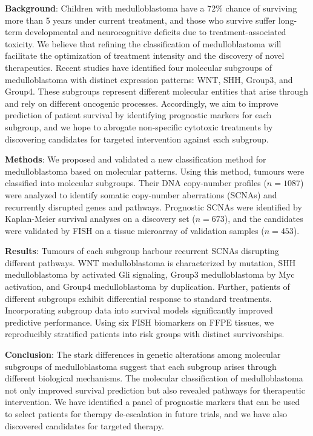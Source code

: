 \textbf{Background}: Children with medulloblastoma have a 72\% chance of surviving more than 5 years under current treatment, and those who survive suffer long-term developmental and neurocognitive deficits due to treatment-associated toxicity. We believe that refining the classification of medulloblastoma will facilitate the optimization of treatment intensity and the discovery of novel therapeutics. Recent studies have identified four molecular subgroups of medulloblastoma with distinct expression patterns: WNT, SHH, Group3, and Group4. These subgroups represent different molecular entities that arise through and rely on different oncogenic processes. Accordingly, we aim to improve prediction of patient survival by identifying prognostic markers for each subgroup, and we hope to abrogate non-specific cytotoxic treatments by discovering candidates for targeted intervention against each subgroup.

\textbf{Methods}: We proposed and validated a new classification method for medulloblastoma based on molecular patterns. Using this method, tumours were classified into molecular subgroups. Their DNA copy-number profiles ($n=1087$) were analyzed to identify somatic copy-number aberrations (SCNAs) and recurrently disrupted genes and pathways. Prognostic SCNAs were identified by Kaplan-Meier survival analyses on a discovery set ($n=673$), and the candidates were validated by FISH on a tissue microarray of validation samples ($n=453$).

\textbf{Results}: Tumours of each subgroup harbour recurrent SCNAs disrupting different pathways. WNT medulloblastoma is characterized by  mutation, SHH medulloblastoma by activated Gli signaling, Group3 medulloblastoma by Myc activation, and Group4 medulloblastoma by  duplication. Further, patients of different subgroups exhibit differential response to standard treatments. Incorporating subgroup data into survival models significantly improved predictive performance. Using six FISH biomarkers on FFPE tissues, we reproducibly stratified patients into risk groups with distinct survivorships.

\textbf{Conclusion}: The stark differences in genetic alterations among molecular subgroups of medulloblastoma suggest that each subgroup arises through different biological mechanisms. The molecular classification of medulloblastoma not only improved survival prediction but also revealed pathways for therapeutic intervention. We have identified a panel of prognostic markers that can be used to select patients for therapy de-escalation in future trials, and we have also discovered candidates for targeted therapy.